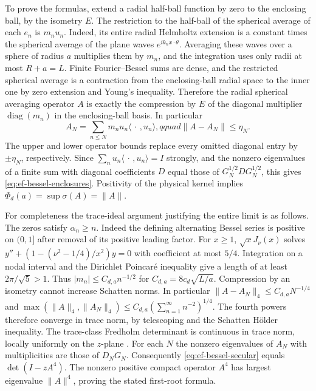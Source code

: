 \documentclass[11pt,a4paper]{article}
\numberwithin{equation}{section}
\begin{document}
To prove the formulas, extend a radial half-ball function by zero to the enclosing ball, by the isometry $E$. The restriction to the half-ball of the spherical average of each $e_n$ is $m_n u_n$. Indeed, its entire radial Helmholtz extension is a constant times the spherical average of the plane waves $e^{ik_n x\cdot\theta}$. Averaging these waves over a sphere of radius $a$ multiplies them by $m_n$, and the integration uses only radii at most $R+a=L$. Finite Fourier--Bessel sums are dense, and the restricted spherical average is a contraction from the enclosing-ball radial space to the inner one by zero extension and Young's inequality. Therefore the radial spherical averaging operator $A$ is exactly the compression by $E$ of the diagonal multiplier $\operatorname{diag}(m_n)$ in the enclosing-ball basis. In particular
\[
 A_N=\sum_{n\le N}m_n u_n\langle\,\cdot\,,u_n\rangle,qquad \|A-A_N\|\le\eta_N.
\]
The upper and lower operator bounds replace every omitted diagonal entry by $\pm\eta_N$, respectively. Since $\sum_nu_n\langle\,\cdot\,,u_n\rangle=I$ strongly, and the nonzero eigenvalues of a finite sum with diagonal coefficients $D$ equal those of $G_N^{1/2}DG_N^{1/2}$, this gives \eqref{eq:ef-bessel-enclosures}. Positivity of the physical kernel implies $\Phi_d(a)=\sup\sigma(A)=\|A\|$.

For completeness the trace-ideal argument justifying the entire limit is as follows. The zeros satisfy $\alpha_n\ge n$. Indeed the defining alternating Bessel series is positive on $(0,1]$ after removal of its positive leading factor. For $x\ge1$, $\sqrt{x}J_\nu(x)$ solves $y''+(1-(\nu^2-1/4)/x^2)y=0$ with coefficient at most $5/4$. Integration on a nodal interval and the Dirichlet Poincar\'e inequality give a length of at least $2\pi/\sqrt5>1$. Thus $|m_n|\le C_{d,a} n^{-1/2}$ for $C_{d,a}=8c_d\sqrt{L/a}$. Compression by an isometry cannot increase Schatten norms. In particular $\|A-A_N\|_4\le C_{d,a}N^{-1/4}$ and $\max(\|A\|_4,\|A_N\|_4)\le C_{d,a}(\sum_{n=1}^\infty n^{-2})^{1/4}$. The fourth powers therefore converge in trace norm, by telescoping and the Schatten H\"older inequality. The trace-class Fredholm determinant is continuous in trace norm, locally uniformly on the $z$-plane \cite[Chap.~3]{SimonTrace}. For each $N$ the nonzero eigenvalues of $A_N$ with multiplicities are those of $D_NG_N$. Consequently \eqref{eq:ef-bessel-secular} equals $\det(I-zA^4)$. The nonzero positive compact operator $A^4$ has largest eigenvalue $\|A\|^4$, proving the stated first-root formula.
\end{document}
